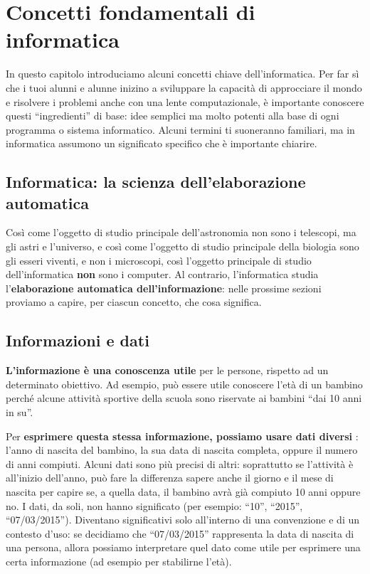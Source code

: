 \chapter{Concetti fondamentali di informatica}\label{fondamentali-di-informatica}

In questo capitolo introduciamo alcuni concetti chiave dell'informatica. Per far sì che i tuoi alunni e alunne inizino a sviluppare la capacità di approcciare il mondo e risolvere i problemi anche con una lente computazionale, è importante conoscere questi ``ingredienti'' di base: idee semplici ma molto potenti alla base di ogni programma o sistema informatico. Alcuni termini ti suoneranno familiari, ma in informatica assumono un significato specifico che è importante chiarire.

\section{Informatica: la scienza dell'elaborazione automatica }\label{informatica-la-scienza-dellelaborazione-automatica}

Così come l'oggetto di studio principale dell'astronomia non sono i telescopi, ma gli astri e l'universo, e così come l'oggetto di studio principale della biologia sono gli esseri viventi, e non i microscopi, così l'oggetto principale di studio dell'informatica \textbf{non} sono i computer. Al contrario, l'informatica studia l'\textbf{elaborazione automatica dell'informazione}: nelle prossime sezioni proviamo a capire, per ciascun concetto, che cosa significa.

\section{Informazioni e dati }\label{informazioni-e-dati}

\textbf{L'informazione è una conoscenza utile} per le persone, rispetto ad un determinato obiettivo. Ad esempio, può essere utile conoscere l'età di un bambino perché alcune attività sportive della scuola sono riservate ai bambini ``dai 10 anni in su''.

Per \textbf{esprimere questa stessa informazione, possiamo usare dati diversi} \parencite{lonati-monga-2025}: l'anno di nascita del bambino, la sua data di nascita completa, oppure il numero di anni compiuti. Alcuni dati sono più precisi di altri: soprattutto se l'attività è all'inizio dell'anno, può fare la differenza sapere anche il giorno e il mese di nascita per capire se, a quella data, il bambino avrà già compiuto 10 anni oppure no. I dati, da soli, non hanno significato (per esempio: ``10'', ``2015'', ``07/03/2015''). Diventano significativi solo all'interno di una convenzione e di un contesto d'uso: se decidiamo che ``07/03/2015'' rappresenta la data di nascita di una persona, allora possiamo interpretare quel dato come utile per esprimere una certa informazione (ad esempio per stabilirne l'età).

